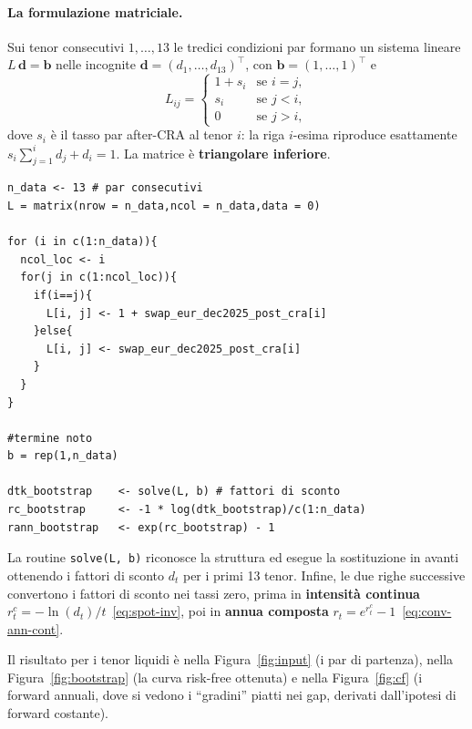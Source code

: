 \documentclass[11pt,a4paper]{article}
\theoremstyle{plain}
\theoremstyle{definition}
\theoremstyle{remark}
\begin{document}
\paragraph{La formulazione matriciale.}
Sui tenor consecutivi $1,\ldots,13$ le tredici condizioni par formano un sistema lineare
$L\,\mathbf d = \mathbf b$ nelle incognite $\mathbf d=(d_1,\ldots,d_{13})^\top$, con
$\mathbf b = (1,\ldots,1)^\top$ e
\[
  L_{ij} =
  \begin{cases}
    1 + s_i & \text{se } i = j,\\
    s_i     & \text{se } j < i,\\
    0       & \text{se } j > i,
  \end{cases}
\]
dove $s_i$ \`e il tasso par after-CRA al tenor $i$: la riga $i$-esima riproduce
esattamente $s_i\sum_{j=1}^{i} d_j + d_i = 1$. La matrice \`e \textbf{triangolare inferiore}.

\begin{codebox}
\begin{Verbatim}[fontsize=\small]
n_data <- 13 # par consecutivi
L = matrix(nrow = n_data,ncol = n_data,data = 0)

for (i in c(1:n_data)){
  ncol_loc <- i
  for(j in c(1:ncol_loc)){
    if(i==j){
      L[i, j] <- 1 + swap_eur_dec2025_post_cra[i]
    }else{
      L[i, j] <- swap_eur_dec2025_post_cra[i]
    }
  }
}

#termine noto
b = rep(1,n_data)

dtk_bootstrap    <- solve(L, b) # fattori di sconto
rc_bootstrap     <- -1 * log(dtk_bootstrap)/c(1:n_data)
rann_bootstrap   <- exp(rc_bootstrap) - 1
\end{Verbatim}
\end{codebox}

La routine \texttt{solve(L, b)} riconosce la struttura ed
esegue la sostituzione in avanti ottenendo i fattori di sconto $d_t$ per i primi 13 tenor. Infine, 
le due righe successive convertono i fattori di sconto nei
tassi zero, prima in \textbf{intensit\`a continua}
$r^c_t = -\ln(d_t)/t$~\eqref{eq:spot-inv}, poi in \textbf{annua composta}
$r_t = e^{r^c_t}-1$~\eqref{eq:conv-ann-cont}.

Il risultato per i tenor liquidi \`e nella Figura~\ref{fig:input} (i par di partenza),
nella Figura~\ref{fig:bootstrap} (la curva risk-free ottenuta) e nella
Figura~\ref{fig:cf} (i forward annuali, dove si vedono i ``gradini'' piatti nei gap, derivati dall'ipotesi di forward costante).
\end{document}
